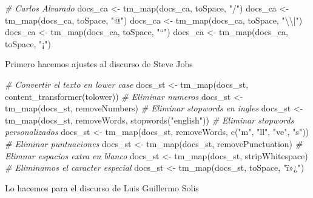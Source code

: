 \documentclass[
]{article}
\newenvironment{Shaded}{\begin{snugshade}}{\end{snugshade}}
\newcommand{\CommentTok}[1]{\textcolor[rgb]{0.56,0.35,0.01}{\textit{#1}}}
\newcommand{\FunctionTok}[1]{\textcolor[rgb]{0.00,0.00,0.00}{#1}}
\newcommand{\NormalTok}[1]{#1}
\newcommand{\OtherTok}[1]{\textcolor[rgb]{0.56,0.35,0.01}{#1}}
\newcommand{\SpecialCharTok}[1]{\textcolor[rgb]{0.00,0.00,0.00}{#1}}
\newcommand{\StringTok}[1]{\textcolor[rgb]{0.31,0.60,0.02}{#1}}
\begin{document}
\begin{Shaded}
\begin{Highlighting}[]
\CommentTok{\# Carlos Alvarado}
\NormalTok{docs\_ca }\OtherTok{\textless{}{-}} \FunctionTok{tm\_map}\NormalTok{(docs\_ca, toSpace, }\StringTok{"/"}\NormalTok{)}
\NormalTok{docs\_ca }\OtherTok{\textless{}{-}} \FunctionTok{tm\_map}\NormalTok{(docs\_ca, toSpace, }\StringTok{"@"}\NormalTok{)}
\NormalTok{docs\_ca }\OtherTok{\textless{}{-}} \FunctionTok{tm\_map}\NormalTok{(docs\_ca, toSpace, }\StringTok{"}\SpecialCharTok{\textbackslash{}\textbackslash{}}\StringTok{|"}\NormalTok{)}
\NormalTok{docs\_ca }\OtherTok{\textless{}{-}} \FunctionTok{tm\_map}\NormalTok{(docs\_ca, toSpace, }\StringTok{"“"}\NormalTok{)}
\NormalTok{docs\_ca }\OtherTok{\textless{}{-}} \FunctionTok{tm\_map}\NormalTok{(docs\_ca, toSpace, }\StringTok{"¡"}\NormalTok{)}
\end{Highlighting}
\end{Shaded}

Primero hacemos ajustes al discurso de Steve Jobs

\begin{Shaded}
\begin{Highlighting}[]
\CommentTok{\# Convertir el texto en lower case}
\NormalTok{docs\_st }\OtherTok{\textless{}{-}} \FunctionTok{tm\_map}\NormalTok{(docs\_st, }\FunctionTok{content\_transformer}\NormalTok{(tolower))}
\CommentTok{\# Eliminar numeros}
\NormalTok{docs\_st }\OtherTok{\textless{}{-}} \FunctionTok{tm\_map}\NormalTok{(docs\_st, removeNumbers)}
\CommentTok{\# Eliminar stopwords en ingles}
\NormalTok{docs\_st }\OtherTok{\textless{}{-}} \FunctionTok{tm\_map}\NormalTok{(docs\_st, removeWords, }\FunctionTok{stopwords}\NormalTok{(}\StringTok{"english"}\NormalTok{))}
\CommentTok{\# Eliminar stopwords personalizados}
\NormalTok{docs\_st }\OtherTok{\textless{}{-}} \FunctionTok{tm\_map}\NormalTok{(docs\_st, removeWords, }\FunctionTok{c}\NormalTok{(}\StringTok{"m"}\NormalTok{, }\StringTok{"ll"}\NormalTok{, }\StringTok{"ve"}\NormalTok{, }\StringTok{"s"}\NormalTok{))}
\CommentTok{\# Eliminar puntuaciones}
\NormalTok{docs\_st }\OtherTok{\textless{}{-}} \FunctionTok{tm\_map}\NormalTok{(docs\_st, removePunctuation)}
\CommentTok{\# Elimnar espacios extra en blanco}
\NormalTok{docs\_st }\OtherTok{\textless{}{-}} \FunctionTok{tm\_map}\NormalTok{(docs\_st, stripWhitespace)}
\CommentTok{\# Eliminamos el caracter especial}
\NormalTok{docs\_st }\OtherTok{\textless{}{-}} \FunctionTok{tm\_map}\NormalTok{(docs\_st, toSpace, }\StringTok{"ï»¿"}\NormalTok{)}
\end{Highlighting}
\end{Shaded}

Lo hacemos para el discurso de Luis Guillermo Solis
\end{document}

